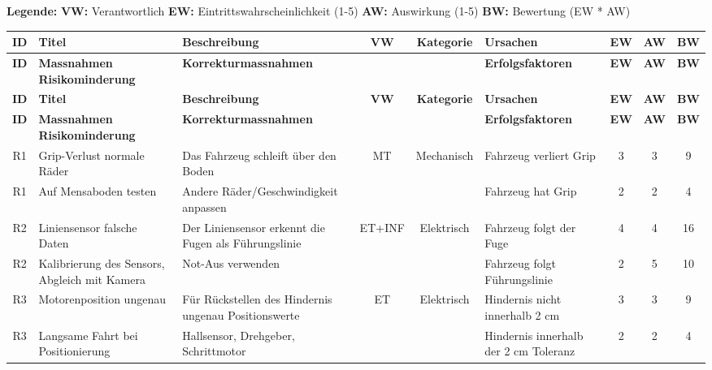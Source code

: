 \documentclass[../main.tex]{subfiles}
\makeatletter
\def\nbhline{%
\noalign{%
  \global\let\tmp\@lowpenalty
  \gdef\@lowpenalty{-10000 }}%
\hline
\noalign{\global\let\@lowpenalty\tmp}}
\makeatother
\begin{document}
\begin{landscape}
\newpage
\scriptsize

\textbf{Legende:}
\hspace{1cm}
\textbf{VW:} Verantwortlich
\hspace{1cm}
\textbf{EW:} Eintrittswahrscheinlichkeit (1-5)
\hspace{1cm}
\textbf{AW:} Auswirkung (1-5)
\hspace{1cm}
\textbf{BW:} Bewertung (EW * AW)

\renewcommand{\arraystretch}{1.5} %
\begin{longtable}{|c|p{4cm}|p{4cm}|c|c|p{4cm}|c|c|c|}
\hline
\rowcolor{white} 
\textbf{ID} & \textbf{Titel} & \textbf{Beschreibung} & \textbf{VW} & \textbf{Kategorie} & \textbf{Ursachen} & \textbf{EW} & \textbf{AW} & \textbf{BW} \\ \hline
\rowcolor{white}
\textbf{ID} & \textbf{Massnahmen Risikominderung} & \textbf{Korrekturmassnahmen} & & & \textbf{Erfolgsfaktoren} & \textbf{EW} & \textbf{AW} & \textbf{BW} \\ \hline
\endfirsthead
\hline
\rowcolor{white} 
\textbf{ID} & \textbf{Titel} & \textbf{Beschreibung} & \textbf{VW} & \textbf{Kategorie} & \textbf{Ursachen} & \textbf{EW} & \textbf{AW} & \textbf{BW} \\ \hline
\rowcolor{white}
\textbf{ID} & \textbf{Massnahmen Risikominderung} & \textbf{Korrekturmassnahmen} & & & \textbf{Erfolgsfaktoren} & \textbf{EW} & \textbf{AW} & \textbf{BW} \\ \hline
\endhead

\rowcolor[HTML]{F5F5F5} R1 & Grip-Verlust normale Räder & Das Fahrzeug schleift über den Boden & MT & Mechanisch & Fahrzeug verliert Grip & 3 & 3 & 9 \\ \nbhline
\rowcolor[HTML]{F5F5F5} R1 & Auf Mensaboden testen & Andere Räder/Geschwindigkeit anpassen & & & Fahrzeug hat Grip & 2 & 2 & 4 \\ \hline

\rowcolor{white} R2 & Liniensensor falsche Daten & Der Liniensensor erkennt die Fugen als Führungslinie & ET+INF & Elektrisch & Fahrzeug folgt der Fuge & 4 & 4 & 16 \\ \nbhline
\rowcolor{white} R2 & Kalibrierung des Sensors, Abgleich mit Kamera & Not-Aus verwenden & & & Fahrzeug folgt Führungslinie & 2 & 5 & 10 \\ \hline

\rowcolor[HTML]{F5F5F5} R3 & Motorenposition ungenau & Für Rückstellen des Hindernis ungenau Positionswerte & ET & Elektrisch & Hindernis nicht innerhalb 2 cm & 3 & 3 & 9 \\ \nbhline
\rowcolor[HTML]{F5F5F5} R3 & Langsame Fahrt bei Positionierung & Hallsensor, Drehgeber, Schrittmotor & & & Hindernis innerhalb der 2 cm Toleranz & 2 & 2 & 4 \\ \hline


\end{longtable}
\end{landscape}
\end{document}
